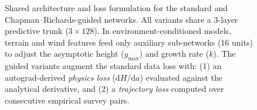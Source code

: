 \begin{figure}[!htbp]
\centering
{}
\caption{Shared architecture and loss formulation for the standard and Chapman--Richards-guided networks. All variants share a 3-layer predictive trunk ($3 \times 128$). In environment-conditioned models, terrain and wind features feed only auxiliary sub-networks (16 units) to adjust the asymptotic height ($y_{\max}$) and growth rate ($k$). The guided variants augment the standard data loss with: (1) an autograd-derived \emph{physics loss} ($\mathrm{d}H/\mathrm{d}a$) evaluated against the analytical derivative, and (2) a \emph{trajectory loss} computed over consecutive empirical survey pairs.}
\label{fig:model-architecture}
\end{figure}

